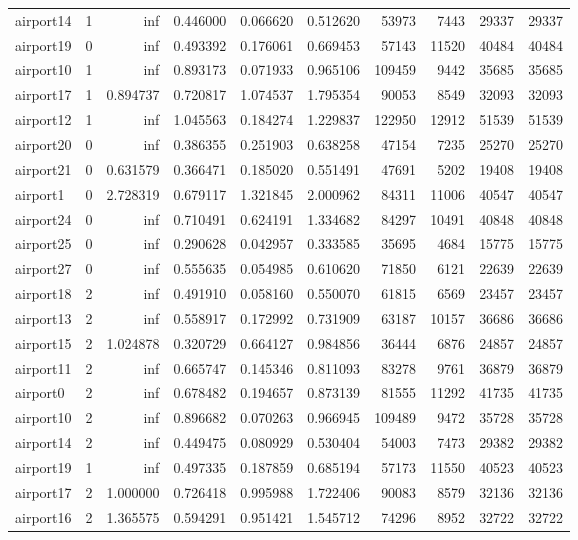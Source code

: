 \begin{longtable}{|l|r|r|r|r|r|r|r|r|r|}
airport14 & 1 & inf & 0.446000 & 0.066620 & 0.512620 & 53973 & 7443 & 29337 & 29337 \\
airport19 & 0 & inf & 0.493392 & 0.176061 & 0.669453 & 57143 & 11520 & 40484 & 40484 \\
airport10 & 1 & inf & 0.893173 & 0.071933 & 0.965106 & 109459 & 9442 & 35685 & 35685 \\
airport17 & 1 & 0.894737 & 0.720817 & 1.074537 & 1.795354 & 90053 & 8549 & 32093 & 32093 \\
airport12 & 1 & inf & 1.045563 & 0.184274 & 1.229837 & 122950 & 12912 & 51539 & 51539 \\
airport20 & 0 & inf & 0.386355 & 0.251903 & 0.638258 & 47154 & 7235 & 25270 & 25270 \\
airport21 & 0 & 0.631579 & 0.366471 & 0.185020 & 0.551491 & 47691 & 5202 & 19408 & 19408 \\
airport1 & 0 & 2.728319 & 0.679117 & 1.321845 & 2.000962 & 84311 & 11006 & 40547 & 40547 \\
airport24 & 0 & inf & 0.710491 & 0.624191 & 1.334682 & 84297 & 10491 & 40848 & 40848 \\
airport25 & 0 & inf & 0.290628 & 0.042957 & 0.333585 & 35695 & 4684 & 15775 & 15775 \\
airport27 & 0 & inf & 0.555635 & 0.054985 & 0.610620 & 71850 & 6121 & 22639 & 22639 \\
airport18 & 2 & inf & 0.491910 & 0.058160 & 0.550070 & 61815 & 6569 & 23457 & 23457 \\
airport13 & 2 & inf & 0.558917 & 0.172992 & 0.731909 & 63187 & 10157 & 36686 & 36686 \\
airport15 & 2 & 1.024878 & 0.320729 & 0.664127 & 0.984856 & 36444 & 6876 & 24857 & 24857 \\
airport11 & 2 & inf & 0.665747 & 0.145346 & 0.811093 & 83278 & 9761 & 36879 & 36879 \\
airport0 & 2 & inf & 0.678482 & 0.194657 & 0.873139 & 81555 & 11292 & 41735 & 41735 \\
airport10 & 2 & inf & 0.896682 & 0.070263 & 0.966945 & 109489 & 9472 & 35728 & 35728 \\
airport14 & 2 & inf & 0.449475 & 0.080929 & 0.530404 & 54003 & 7473 & 29382 & 29382 \\
airport19 & 1 & inf & 0.497335 & 0.187859 & 0.685194 & 57173 & 11550 & 40523 & 40523 \\
airport17 & 2 & 1.000000 & 0.726418 & 0.995988 & 1.722406 & 90083 & 8579 & 32136 & 32136 \\
airport16 & 2 & 1.365575 & 0.594291 & 0.951421 & 1.545712 & 74296 & 8952 & 32722 & 32722 \\

\end{longtable}
